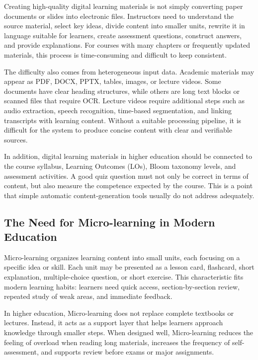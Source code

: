 Creating high-quality digital learning materials is not simply converting
paper documents or slides into electronic files. Instructors need to understand
the source material, select key ideas, divide content into smaller units,
rewrite it in language suitable for learners, create assessment questions,
construct answers, and provide explanations. For courses with many chapters or
frequently updated materials, this process is time-consuming and difficult to
keep consistent.

The difficulty also comes from heterogeneous input data. Academic materials may
appear as PDF, DOCX, PPTX, tables, images, or lecture videos. Some documents
have clear heading structures, while others are long text blocks or scanned
files that require OCR. Lecture videos require additional steps such as audio
extraction, speech recognition, time-based segmentation, and linking
transcripts with learning content. Without a suitable processing pipeline, it
is difficult for the system to produce concise content with clear and
verifiable sources.

In addition, digital learning materials in higher education should be connected
to the course syllabus, Learning Outcomes (LOs), Bloom taxonomy levels, and
assessment activities. A good quiz question must not only be correct in terms
of content, but also measure the competence expected by the course. This is a
point that simple automatic content-generation tools usually do not address
adequately.

\subsection{The Need for Micro-learning in Modern Education}

Micro-learning organizes learning content into small units, each focusing on a
specific idea or skill. Each unit may be presented as a lesson card,
flashcard, short explanation, multiple-choice question, or short exercise. This
characteristic fits modern learning habits: learners need quick access,
section-by-section review, repeated study of weak areas, and immediate
feedback.

In higher education, Micro-learning does not replace complete textbooks or
lectures. Instead, it acts as a support layer that helps learners approach
knowledge through smaller steps. When designed well, Micro-learning reduces
the feeling of overload when reading long materials, increases the frequency
of self-assessment, and supports review before exams or major assignments.

